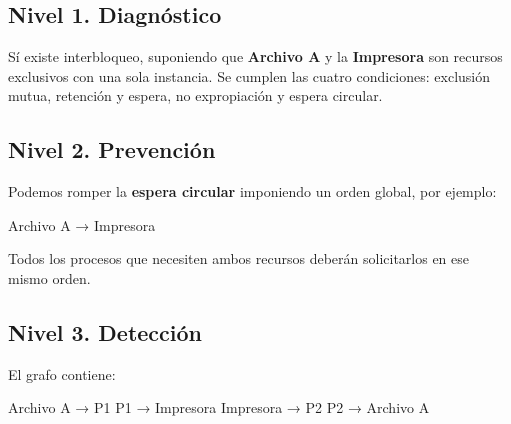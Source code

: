 \documentclass[
  spanish,
  letterpaper,
]{scrbook}
\newenvironment{Shaded}{\begin{snugshade}}{\end{snugshade}}
\newcommand{\NormalTok}[1]{\textcolor[rgb]{0.00,0.23,0.31}{#1}}
\begin{document}
\begin{tcolorbox}[enhanced jigsaw, arc=.35mm, bottomrule=.15mm, bottomtitle=1mm, breakable, colback=white, colbacktitle=quarto-callout-tip-color!10!white, colframe=quarto-callout-tip-color-frame, coltitle=black, left=2mm, leftrule=.75mm, opacityback=0, opacitybacktitle=0.6, rightrule=.15mm, title=\textcolor{quarto-callout-tip-color}{\faLightbulb}\hspace{0.5em}{✅ Ver solución}, titlerule=0mm, toprule=.15mm, toptitle=1mm]

\subsection{Nivel 1. Diagnóstico}\label{nivel-1.-diagnuxf3stico-1}

Sí existe interbloqueo, suponiendo que \textbf{Archivo A} y la
\textbf{Impresora} son recursos exclusivos con una sola instancia. Se
cumplen las cuatro condiciones: exclusión mutua, retención y espera, no
expropiación y espera circular.

\subsection{Nivel 2. Prevención}\label{nivel-2.-prevenciuxf3n-1}

Podemos romper la \textbf{espera circular} imponiendo un orden global,
por ejemplo:

\begin{Shaded}
\begin{Highlighting}[]
\NormalTok{Archivo A → Impresora}
\end{Highlighting}
\end{Shaded}

Todos los procesos que necesiten ambos recursos deberán solicitarlos en
ese mismo orden.

\subsection{Nivel 3. Detección}\label{nivel-3.-detecciuxf3n-1}

El grafo contiene:

\begin{Shaded}
\begin{Highlighting}[]
\NormalTok{Archivo A → P1}
\NormalTok{P1 → Impresora}
\NormalTok{Impresora → P2}
\NormalTok{P2 → Archivo A}
\end{Highlighting}
\end{Shaded}


\end{tcolorbox}
\end{document}
